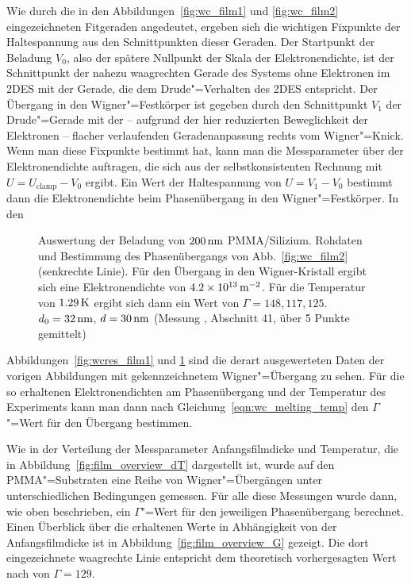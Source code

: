 Wie durch die in den Abbildungen~\ref{fig:wc_film1} und \ref{fig:wc_film2} eingezeichneten Fitgeraden angedeutet, ergeben sich die wichtigen Fixpunkte der Haltespannung aus den Schnittpunkten dieser Geraden. Der Startpunkt der Beladung $V_0$, also der spätere Nullpunkt der Skala der Elektronendichte, ist der Schnittpunkt der nahezu waagrechten Gerade des Systems ohne Elektronen im 2DES mit der Gerade, die dem Drude"=Verhalten des 2DES entspricht. Der Übergang in den Wigner"=Festkörper ist gegeben durch den Schnittpunkt $V_1$ der Drude"=Gerade mit der -- aufgrund der hier reduzierten Beweglichkeit der Elektronen -- flacher verlaufenden Geradenanpassung rechts vom Wigner"=Knick. Wenn man diese Fixpunkte bestimmt hat, kann man die Messparameter über der Elektronendichte auftragen, die sich aus der selbstkonsistenten Rechnung mit $U=U_\text{clamp}-V_0$ ergibt. Ein Wert der Haltespannung von $U=V_1-V_0$ bestimmt dann die Elektronendichte beim Phasenübergang in den Wigner"=Festkörper. In den
\begin{figure}[h!tbp]
    \hfill%
    \begin{minipage}[b]{\textwidth-\midwidth-\tabcolsep}
        \caption[Auswertung Wigner-Übergang auf PMMA]{Auswertung der Beladung von $\unit[200]{nm}$ PMMA/Silizium. Rohdaten und Bestimmung des Phasenübergangs von Abb.~\ref{fig:wc_film2} (senkrechte Linie). Für den Übergang in den Wigner-Kristall ergibt sich eine Elektronendichte von $\unit[4.2\times10^{13}]{\Em}$. Für die Temperatur von $\unit[1.29]{K}$ ergibt sich dann ein Wert von $\Gamma=148, 117, 125$. $d_0=\unit[32]{nm}$, $d=\unit[30]{nm}$ (Messung , Abschnitt 41, über 5 Punkte gemittelt)}
        \label{fig:wcres_film2}
    \end{minipage}
\end{figure}
Abbildungen~\ref{fig:wcres_film1} und \ref{fig:wcres_film2} sind die derart ausgewerteten Daten der vorigen Abbildungen mit gekennzeichnetem Wigner"=Übergang zu sehen. Für die so erhaltenen Elektronendichten am Phasenübergang und der Temperatur des Experiments kann man dann nach Gleichung~\eqref{eqn:wc_melting_temp} den $\Gamma$"=Wert für den Übergang bestimmen.
 
Wie in der Verteilung der Messparameter Anfangsfilmdicke und Temperatur, die in Abbildung~\ref{fig:film_overview_dT} dargestellt ist, wurde auf den PMMA"=Substraten eine Reihe von Wigner"=Übergängen unter unterschiedlichen Bedingungen gemessen. Für alle diese Messungen wurde dann, wie oben beschrieben, ein $\Gamma$"=Wert für den jeweiligen Phasenübergang berechnet. Einen Überblick über die erhaltenen Werte in Abhängigkeit von der Anfangsfilmdicke ist in Abbildung~\ref{fig:film_overview_G} gezeigt. Die dort eingezeichnete waagrechte Linie entspricht dem theoretisch vorhergesagten Wert nach \cite{Mor79} von $\Gamma=129$.

